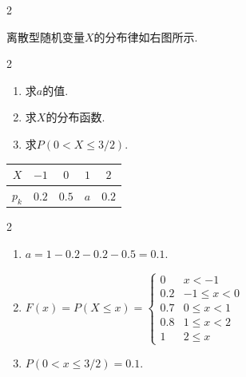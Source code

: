\begin{paracol}{2}
\begin{problem}
    离散型随机变量$X$的分布律如右图所示.
\begin{multicols}{2}
    \begin{enumerate}
        \item 求$a$的值.
        \item 求$X$的分布函数.
        \item 求$P(0<X\leq3/2)$.
    \end{enumerate}
\end{multicols}
\switchcolumn\vspace*{\fill}\centering
    \begin{tabular}{ccccc}
        \toprule
        $X$ & $-1$ & $0$ & $1$ & $2$\\
        \midrule
        $p_k$ & $0.2$ & $0.5$ & $a$ & $0.2$\\
        \bottomrule
    \end{tabular}\vspace*{\fill}
\end{problem}
\end{paracol}
\begin{solution}\leavevmode
    \begin{multicols}{2}
        \begin{enumerate}
            \item $a=1-0.2-0.2-0.5=0.1$.
            \item 
            $F(x)=P(X\leq x)=\begin{cases}
                0 & x<-1\\
                0.2 & -1\leq x<0\\
                0.7 & 0\leq x<1\\
                0.8 & 1\leq x<2\\
                1 & 2\leq x
            \end{cases}$
            \item $P(0<x\leq3/2)=0.1$.
        \end{enumerate}
    \end{multicols}
\end{solution}

